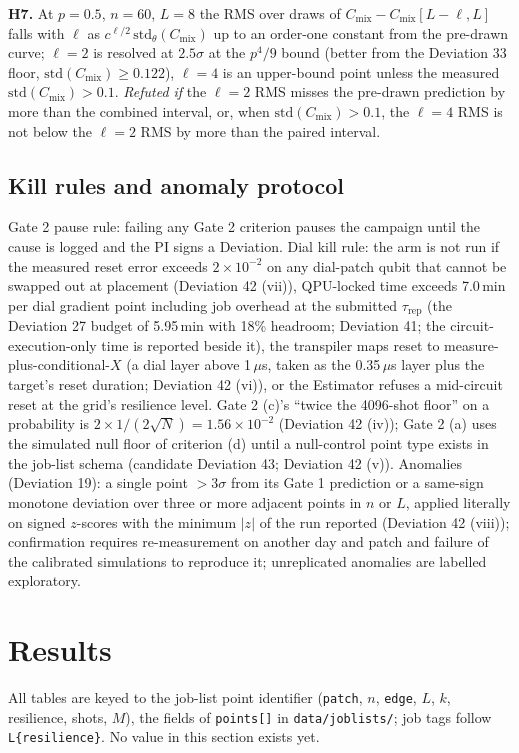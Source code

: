 \documentclass[aps,prxquantum,reprint,superscriptaddress,nofootinbib,longbibliography,amsmath,amssymb]{revtex4-2}
\newcommand{\Cmix}{C_{\mathrm{mix}}}
\begin{document}
\textbf{H7.} At $p = 0.5$, $n = 60$, $L = 8$ the RMS over draws of $\Cmix - \Cmix[L-\ell, L]$ falls with $\ell$ as $c^{\ell/2}\,\mathrm{std}_\theta(\Cmix)$ up to an order-one constant from the pre-drawn curve; $\ell = 2$ is resolved at $2.5\sigma$ at the $p^4/9$ bound (better from the Deviation 33 floor, $\mathrm{std}(\Cmix) \geq 0.122$), $\ell = 4$ is an upper-bound point unless the measured $\mathrm{std}(\Cmix) > 0.1$. \emph{Refuted if} the $\ell = 2$ RMS misses the pre-drawn prediction by more than the combined interval, or, when $\mathrm{std}(\Cmix) > 0.1$, the $\ell = 4$ RMS is not below the $\ell = 2$ RMS by more than the paired interval.

\subsection{Kill rules and anomaly protocol}
Gate 2 pause rule: failing any Gate 2 criterion pauses the campaign until the cause is logged and the PI signs a Deviation. Dial kill rule: the arm is not run if the measured reset error exceeds $2\times10^{-2}$ on any dial-patch qubit that cannot be swapped out at placement (Deviation 42 (vii)), QPU-locked time exceeds 7.0\,min per dial gradient point including job overhead at the submitted $\tau_{\mathrm{rep}}$ (the Deviation 27 budget of 5.95\,min with 18\% headroom; Deviation 41; the circuit-execution-only time is reported beside it), the transpiler maps reset to measure-plus-conditional-$X$ (a dial layer above 1\,$\mu$s, taken as the 0.35\,$\mu$s layer plus the target's reset duration; Deviation 42 (vi)), or the Estimator refuses a mid-circuit reset at the grid's resilience level. Gate 2 (c)'s ``twice the 4096-shot floor'' on a probability is $2\times1/(2\sqrt N) = 1.56\times10^{-2}$ (Deviation 42 (iv)); Gate 2 (a) uses the simulated null floor of criterion (d) until a null-control point type exists in the job-list schema (candidate Deviation 43; Deviation 42 (v)). Anomalies (Deviation 19): a single point $> 3\sigma$ from its Gate 1 prediction or a same-sign monotone deviation over three or more adjacent points in $n$ or $L$, applied literally on signed $z$-scores with the minimum $|z|$ of the run reported (Deviation 42 (viii)); confirmation requires re-measurement on another day and patch and failure of the calibrated simulations to reproduce it; unreplicated anomalies are labelled exploratory.

\section{Results}\label{sec:results}
All tables are keyed to the job-list point identifier (\texttt{patch}, $n$, \texttt{edge}, $L$, $k$, resilience, shots, $M$), the fields of \texttt{points[]} in \texttt{data/joblists/}; job tags follow \texttt{L\{resilience\}}. No value in this section exists yet.
\end{document}

